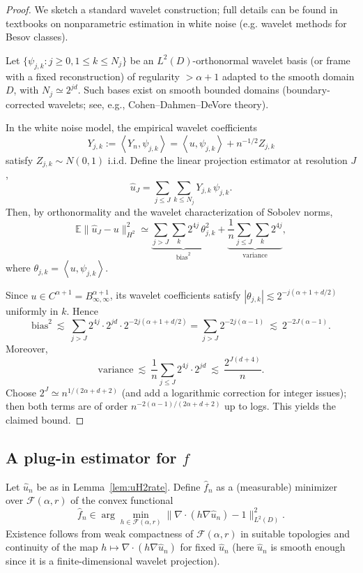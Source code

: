 \documentclass[11pt]{article}
\newcommand{\D}{D}
\newcommand{\ip}[2]{\left\langle #1,#2\right\rangle}
\begin{document}
\begin{proof}
We sketch a standard wavelet construction; full details can be found in textbooks on nonparametric estimation in white noise (e.g. wavelet methods for Besov classes).

Let $\{\psi_{j,k}:j\ge0,1\le k\le N_j\}$ be an $L^2(\D)$-orthonormal wavelet basis (or frame with a fixed reconstruction) of regularity $> \alpha+1$ adapted to the smooth domain $\D$, with $N_j\simeq 2^{jd}$. Such bases exist on smooth bounded domains (boundary-corrected wavelets; see, e.g., Cohen--Dahmen--DeVore theory).

In the white noise model, the empirical wavelet coefficients
\[
Y_{j,k}:=\ip{Y_n}{\psi_{j,k}}=\ip{u}{\psi_{j,k}}+n^{-1/2}Z_{j,k}
\]
satisfy $Z_{j,k}\sim N(0,1)$ i.i.d.
Define the linear projection estimator at resolution $J$,
\[
\hat u_J=\sum_{j\le J}\sum_{k\le N_j} Y_{j,k}\,\psi_{j,k}.
\]
Then, by orthonormality and the wavelet characterization of Sobolev norms,
\[
\mathbb E\|\hat u_J-u\|_{H^2}^2
\simeq \underbrace{\sum_{j>J}\sum_k 2^{4j}\,\theta_{j,k}^2}_{\text{bias}^2}
+ \underbrace{\frac{1}{n}\sum_{j\le J}\sum_k 2^{4j}}_{\text{variance}},
\]
where $\theta_{j,k}=\ip{u}{\psi_{j,k}}$.

Since $u\in C^{\alpha+1}=B^{\alpha+1}_{\infty,\infty}$, its wavelet coefficients satisfy
$|\theta_{j,k}|\lesssim 2^{-j(\alpha+1+d/2)}$ uniformly in $k$. Hence
\[
\text{bias}^2 \ \lesssim\ \sum_{j>J} 2^{4j}\cdot 2^{jd}\cdot 2^{-2j(\alpha+1+d/2)}
=\sum_{j>J}2^{-2j(\alpha-1)}\ \lesssim\ 2^{-2J(\alpha-1)}.
\]
Moreover,
\[
\text{variance} \ \lesssim\ \frac{1}{n}\sum_{j\le J} 2^{4j}\cdot 2^{jd}\ \lesssim\ \frac{2^{J(d+4)}}{n}.
\]
Choose $2^J\simeq n^{1/(2\alpha+d+2)}$ (and add a logarithmic correction for integer issues); then both terms are of order $n^{-2(\alpha-1)/(2\alpha+d+2)}$ up to logs. This yields the claimed bound.
\end{proof}

\subsection{A plug-in estimator for $f$}

Let $\hat u_n$ be as in Lemma~\ref{lem:uH2rate}. Define $\hat f_n$ as a (measurable) minimizer over $\mathcal F(\alpha,r)$ of the convex functional
\begin{equation}\label{eq:plugin}
\hat f_n \in \arg\min_{h\in\mathcal F(\alpha,r)} \bigl\|\nabla\cdot(h\nabla \hat u_n)-1\bigr\|_{L^2(\D)}^2.
\end{equation}
Existence follows from weak compactness of $\mathcal F(\alpha,r)$ in suitable topologies and continuity of the map $h\mapsto \nabla\cdot(h\nabla\hat u_n)$ for fixed $\hat u_n$ (here $\hat u_n$ is smooth enough since it is a finite-dimensional wavelet projection).
\end{document}
